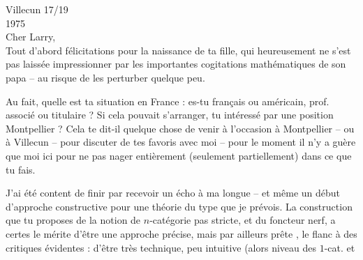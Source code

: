 \hfill Villecun 17/19 \\
\hfill 1975\\
Cher Larry,\\

Tout d'abord félicitations pour la naissance de ta fille, qui heureusement ne s'est pas laissée impressionner par les importantes cogitations mathématiques de son papa -- au risque de les perturber quelque peu.

Au fait, quelle est ta situation en France : es-tu français ou américain, prof. associé ou titulaire ? Si cela pouvait s'arranger,  tu intéressé par une position  Montpellier ? Cela te dit-il quelque chose de venir à l'occasion à Montpellier -- ou à Villecun -- pour discuter de tes favoris avec moi -- pour le moment il n'y a guère que moi ici pour ne pas nager entièrement (seulement partiellement) dans ce que tu fais.

J'ai été content de finir par recevoir un écho à ma longue  -- et même un début d'approche constructive pour  une théorie du type que je prévois. La construction que tu proposes de la notion de $n$-catégorie pas stricte, et du foncteur nerf, a certes le mérite  d'être une  approche précise, mais par ailleurs prête  , le flanc à des critiques évidentes : d'être très technique, peu intuitive (alors  niveau des $1$-cat. et

